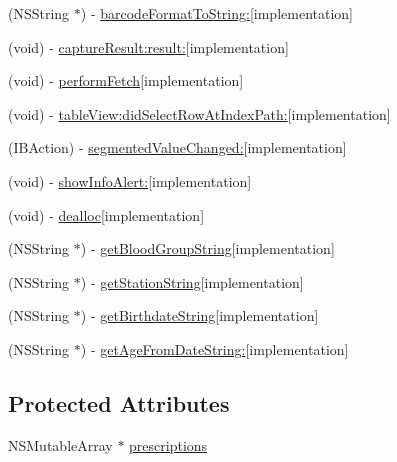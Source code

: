 \begin{DoxyCompactItemize}
\item 
(N\+S\+String $\ast$) -\/ \hyperlink{interface_patient_view_controller_a11f629dfcb05d614948e6a22a9b62609}{barcode\+Format\+To\+String\+:}{\ttfamily  \mbox{[}implementation\mbox{]}}
\item 
(void) -\/ \hyperlink{interface_patient_view_controller_ab0d5b631e4984e8800de2614b454f6e0}{capture\+Result\+:result\+:}{\ttfamily  \mbox{[}implementation\mbox{]}}
\item 
(void) -\/ \hyperlink{interface_patient_view_controller_a8cffe8050d49d33694655744748a830c}{perform\+Fetch}{\ttfamily  \mbox{[}implementation\mbox{]}}
\item 
(void) -\/ \hyperlink{interface_patient_view_controller_a5ed17bea4cad883582bc8bf280e08d59}{table\+View\+:did\+Select\+Row\+At\+Index\+Path\+:}{\ttfamily  \mbox{[}implementation\mbox{]}}
\item 
(I\+B\+Action) -\/ \hyperlink{interface_patient_view_controller_ac4977d46c2378db860bab95582a89894}{segmented\+Value\+Changed\+:}{\ttfamily  \mbox{[}implementation\mbox{]}}
\item 
(void) -\/ \hyperlink{interface_patient_view_controller_a733086f669eb38061d7095742689e013}{show\+Info\+Alert\+:}{\ttfamily  \mbox{[}implementation\mbox{]}}
\item 
(void) -\/ \hyperlink{interface_patient_view_controller_ac5a2964da1dd5c8fe84d38c28846622c}{dealloc}{\ttfamily  \mbox{[}implementation\mbox{]}}
\item 
(N\+S\+String $\ast$) -\/ \hyperlink{interface_patient_view_controller_a25c12bd39732f6874a96e4d44f49b65e}{get\+Blood\+Group\+String}{\ttfamily  \mbox{[}implementation\mbox{]}}
\item 
(N\+S\+String $\ast$) -\/ \hyperlink{interface_patient_view_controller_a735c33ed351ce545b7ef752b678d701d}{get\+Station\+String}{\ttfamily  \mbox{[}implementation\mbox{]}}
\item 
(N\+S\+String $\ast$) -\/ \hyperlink{interface_patient_view_controller_a820ee166c056d50a5642319be75137c5}{get\+Birthdate\+String}{\ttfamily  \mbox{[}implementation\mbox{]}}
\item 
(N\+S\+String $\ast$) -\/ \hyperlink{interface_patient_view_controller_a190044e224811feae72262fe5370c5ff}{get\+Age\+From\+Date\+String\+:}{\ttfamily  \mbox{[}implementation\mbox{]}}
\end{DoxyCompactItemize}
\subsection*{Protected Attributes}
\begin{DoxyCompactItemize}
\item 
N\+S\+Mutable\+Array $\ast$ \hyperlink{interface_patient_view_controller_a342561bab92448e254982cc47cb519d8}{prescriptions}
\end{DoxyCompactItemize}
